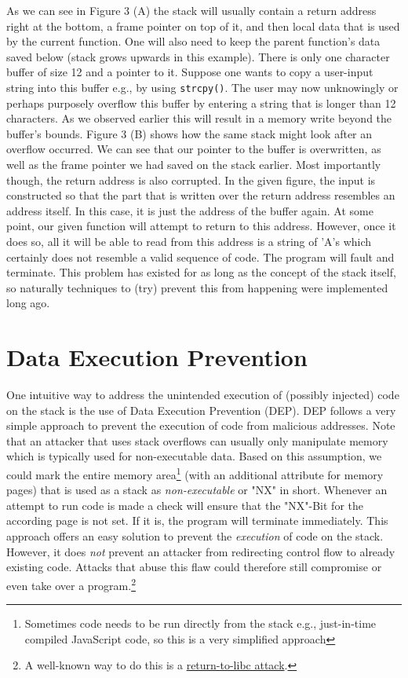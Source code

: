\documentclass[10pt,twocolumn,a4paper]{article}
\begin{document}
\newline
As we can see in Figure 3 (A) the stack will usually contain a return address right at the bottom, a frame pointer on top of it, and then local data that is used by the current function.
One will also need to keep the parent function's data saved below (stack grows upwards in this example).
There is only one character buffer of size 12 and a pointer to it.
Suppose one wants to copy a user-input string into this buffer e.g., by using \texttt{strcpy()}.
The user may now unknowingly or perhaps purposely overflow this buffer by entering a string that is longer than 12 characters.
As we observed earlier this will result in a memory write beyond the buffer's bounds. 
Figure 3 (B) shows how the same stack might look after an overflow occurred. We can see that our pointer to the buffer is overwritten, as well as the frame pointer we had saved on the stack earlier.
Most importantly though, the return address is also corrupted.
In the given figure, the input is constructed so that the part that is written over the return address resembles an address itself.
In this case, it is just the address of the buffer again.
At some point, our given function will attempt to return to this address.
However, once it does so, all it will be able to read from this address is a string of 'A's which certainly does not resemble a valid sequence of code.
The program will fault and terminate.
This problem has existed for as long as the concept of the stack itself, so naturally techniques to (try) prevent this from happening were implemented long ago.

\section{Data Execution Prevention}\label{sec:DEP}
One intuitive way to address the unintended execution of (possibly injected) code on the stack is the use of Data Execution Prevention (DEP).
DEP follows a very simple approach to prevent the execution of code from malicious addresses.
Note that an attacker that uses stack overflows can usually only manipulate memory which is typically used for non-executable data. %
Based on this assumption, we could mark the entire memory area\footnote{Sometimes code needs to be run directly from the stack e.g., just-in-time compiled JavaScript code, so this is a very simplified approach} (with an additional attribute for memory pages) that is used as a stack as \emph{non-executable} or "NX" in short.
Whenever an attempt to run code is made a check will ensure that the "NX"-Bit for the according page is not set. If it is, the program will terminate immediately.
This approach offers an easy solution to prevent the \emph{execution} of code on the stack.
However, it does \emph{not} prevent an attacker from redirecting control flow to already existing code. Attacks that abuse this flaw could therefore still compromise or even take over a program.\footnote{A well-known way to do this is a \hyperref{https://en.wikipedia.org/wiki/Return-to-libc_attack}{Return-to-Libc Exploits}{name}{return-to-libc attack}.}
\end{document}
